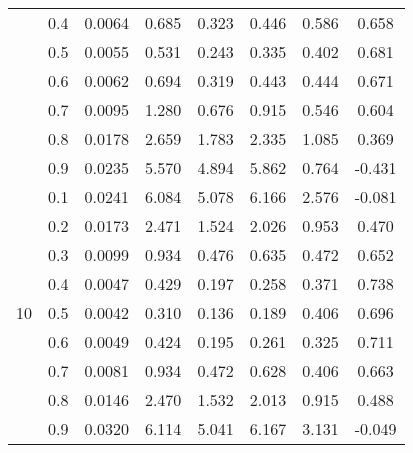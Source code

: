 \documentclass[11pt,a4paper]{report}
\begin{document}
\begin{longtable}{ | c | c || c | c | c | c | c | c | }
 & 0.4 & 0.0064 & 0.685 & 0.323 & 0.446 & 0.586 & 0.658 \\
 & 0.5 & 0.0055 & 0.531 & 0.243 & 0.335 & 0.402 & 0.681 \\
 & 0.6 & 0.0062 & 0.694 & 0.319 & 0.443 & 0.444 & 0.671 \\
 & 0.7 & 0.0095 & 1.280 & 0.676 & 0.915 & 0.546 & 0.604 \\
 & 0.8 & 0.0178 & 2.659 & 1.783 & 2.335 & 1.085 & 0.369 \\
 & 0.9 & 0.0235 & 5.570 & 4.894 & 5.862 & 0.764 & -0.431 \\
 \hline
\multirow{9}{*}{10} & 0.1 & 0.0241 & 6.084 & 5.078 & 6.166 & 2.576 & -0.081 \\
 & 0.2 & 0.0173 & 2.471 & 1.524 & 2.026 & 0.953 & 0.470 \\
 & 0.3 & 0.0099 & 0.934 & 0.476 & 0.635 & 0.472 & 0.652 \\
 & 0.4 & 0.0047 & 0.429 & 0.197 & 0.258 & 0.371 & 0.738 \\
 & 0.5 & 0.0042 & 0.310 & 0.136 & 0.189 & 0.406 & 0.696 \\
 & 0.6 & 0.0049 & 0.424 & 0.195 & 0.261 & 0.325 & 0.711 \\
 & 0.7 & 0.0081 & 0.934 & 0.472 & 0.628 & 0.406 & 0.663 \\
 & 0.8 & 0.0146 & 2.470 & 1.532 & 2.013 & 0.915 & 0.488 \\
 & 0.9 & 0.0320 & 6.114 & 5.041 & 6.167 & 3.131 & -0.049 \\
 \hline
\hline
\end{longtable}
\end{document}
